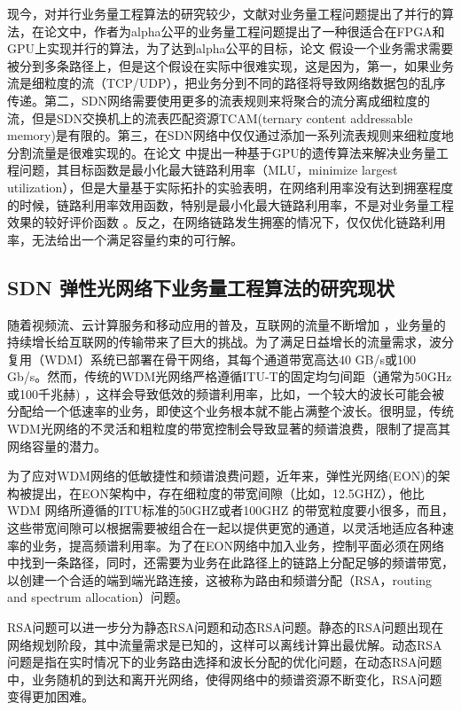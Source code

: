 \documentclass[master]{thesis-uestc}
\begin{document}
现今，对并行业务量工程算法的研究较少，文献对业务量工程问题提出了并行的算法，在论文中，作者为alpha公平的业务量工程问题提出了一种很适合在FPGA和GPU上实现并行的算法，为了达到alpha公平的目标，论文 假设一个业务需求需要被分到多条路径上，但是这个假设在实际中很难实现，这是因为，第一，如果业务流是细粒度的流（TCP/UDP），把业务分到不同的路径将导致网络数据包的乱序传递。第二，SDN网络需要使用更多的流表规则来将聚合的流分离成细粒度的流，但是SDN交换机上的流表匹配资源TCAM(ternary content addressable memory)是有限的。第三，在SDN网络中仅仅通过添加一系列流表规则来细粒度地分割流量是很难实现的。在论文 中提出一种基于GPU的遗传算法来解决业务量工程问题，其目标函数是最小化最大链路利用率（MLU，minimize largest utilization），但是大量基于实际拓扑的实验表明，在网络利用率没有达到拥塞程度的时候，链路利用率效用函数，特别是最小化最大链路利用率，不是对业务量工程效果的较好评价函数 。反之，在网络链路发生拥塞的情况下，仅仅优化链路利用率，无法给出一个满足容量约束的可行解。

\subsection{SDN 弹性光网络下业务量工程算法的研究现状}
随着视频流、云计算服务和移动应用的普及，互联网的流量不断增加 ，业务量的持续增长给互联网的传输带来了巨大的挑战。为了满足日益增长的流量需求，波分复用（WDM）系统已部署在骨干网络，其每个通道带宽高达40 GB/s或100 Gb/s。然而，传统的WDM光网络严格遵循ITU-T的固定均匀间距（通常为50GHz或100千兆赫) ，这样会导致低效的频谱利用率，比如，一个较大的波长可能会被分配给一个低速率的业务，即使这个业务根本就不能占满整个波长。很明显，传统WDM光网络的不灵活和粗粒度的带宽控制会导致显著的频谱浪费，限制了提高其网络容量的潜力。

为了应对WDM网络的低敏捷性和频谱浪费问题，近年来，弹性光网络(EON)的架构被提出，在EON架构中，存在细粒度的带宽间隙（比如，12.5GHZ），他比WDM 网络所遵循的ITU标准的50GHZ或者100GHZ 的带宽粒度要小很多，而且，这些带宽间隙可以根据需要被组合在一起以提供更宽的通道，以灵活地适应各种速率的业务，提高频谱利用率。为了在EON网络中加入业务，控制平面必须在网络中找到一条路径，同时，还需要为业务在此路径上的链路上分配足够的频谱带宽，以创建一个合适的端到端光路连接，这被称为路由和频谱分配（RSA，routing and spectrum allocation）问题。

RSA问题可以进一步分为静态RSA问题和动态RSA问题。静态的RSA问题出现在网络规划阶段，其中流量需求是已知的，这样可以离线计算出最优解。动态RSA问题是指在实时情况下的业务路由选择和波长分配的优化问题，在动态RSA问题中，业务随机的到达和离开光网络，使得网络中的频谱资源不断变化，RSA问题变得更加困难。
\end{document}
